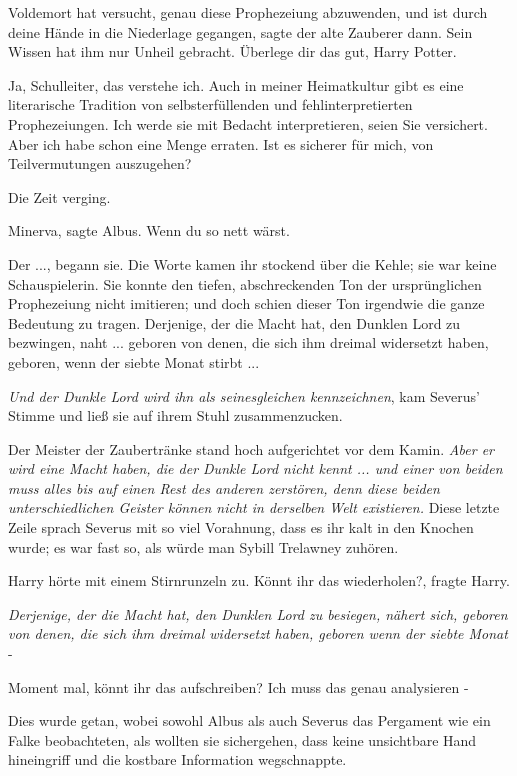 \glqq{}Voldemort hat versucht, genau diese Prophezeiung abzuwenden, und ist durch
deine Hände in die Niederlage gegangen\grqq{}, sagte der alte Zauberer dann.
\glqq{}Sein Wissen hat ihm nur Unheil gebracht. Überlege dir das gut, Harry
Potter.\grqq{}

\glqq{}Ja, Schulleiter, das verstehe ich. Auch in meiner Heimatkultur gibt es
eine literarische Tradition von selbsterfüllenden und fehlinterpretierten
Prophezeiungen. Ich werde sie mit Bedacht interpretieren, seien Sie versichert.
Aber ich habe schon eine Menge erraten. Ist es sicherer für mich, von
Teilvermutungen auszugehen?\grqq{}

Die Zeit verging.

\glqq{}Minerva\grqq{}, sagte Albus. \glqq{}Wenn du so nett wärst.\grqq{}

\glqq{}Der ...\grqq{}, begann sie. Die Worte kamen ihr stockend über die Kehle;
sie war keine Schauspielerin. Sie konnte den tiefen, abschreckenden Ton der
ursprünglichen Prophezeiung nicht imitieren; und doch schien dieser Ton
irgendwie die ganze Bedeutung zu tragen. \glqq{}Derjenige, der die Macht hat, den
Dunklen Lord zu bezwingen, naht ... geboren von denen, die sich ihm dreimal
widersetzt haben, geboren, wenn der siebte Monat stirbt ...\grqq{}

\glqq{}\emph{Und der Dunkle Lord wird ihn als seinesgleichen
kennzeichnen}\grqq{}, kam Severus' Stimme und ließ sie auf ihrem Stuhl
zusammenzucken.

Der Meister der Zaubertränke stand hoch aufgerichtet vor dem Kamin. \glqq{}
\emph{Aber er wird eine Macht haben, die der Dunkle Lord nicht kennt ... und
einer von beiden muss alles bis auf einen Rest des anderen zerstören, denn diese
beiden unterschiedlichen Geister können nicht in derselben Welt existieren.}\grqq{}
Diese letzte Zeile sprach Severus mit so viel Vorahnung, dass es ihr kalt in den
Knochen wurde; es war fast so, als würde man Sybill Trelawney zuhören.

Harry hörte mit einem Stirnrunzeln zu. \glqq{}Könnt ihr das wiederholen?\grqq{},
fragte Harry.

\glqq{}\emph{Derjenige, der die Macht hat, den Dunklen Lord zu besiegen, nähert
sich, geboren von denen, die sich ihm dreimal widersetzt haben, geboren wenn der
siebte Monat} -\grqq{}

\glqq{}Moment mal, könnt ihr das aufschreiben? Ich muss das genau analysieren
-\grqq{}

Dies wurde getan, wobei sowohl Albus als auch Severus das Pergament wie ein
Falke beobachteten, als wollten sie sichergehen, dass keine unsichtbare Hand
hineingriff und die kostbare Information wegschnappte.

